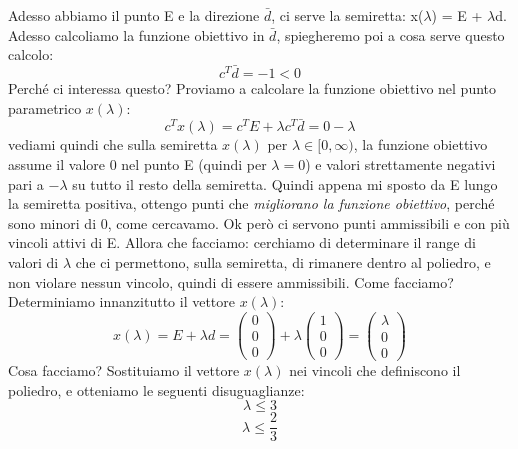 Adesso abbiamo il punto E e la direzione $\bar{d}$, ci serve la semiretta: x($\lambda$) = E + $\lambda$d. Adesso calcoliamo la funzione obiettivo in $\bar{d}$, spiegheremo poi a cosa serve questo calcolo:
\begin{equation*}
    c^T\bar{d} = -1 < 0
\end{equation*}
Perché ci interessa questo? Proviamo a calcolare la funzione obiettivo nel punto parametrico $x(\lambda)$:
\begin{equation*}
    c^Tx(\lambda) = c^TE + \lambda c^T\bar{d} = 0 - \lambda
\end{equation*}
vediami quindi che sulla semiretta $x(\lambda)$ per $\lambda \in [0, \infty)$, la funzione obiettivo assume il valore 0 nel punto E (quindi per $\lambda = 0$) e valori strettamente negativi pari a $-\lambda$ su tutto il resto della semiretta. Quindi appena mi sposto da E lungo la semiretta positiva, ottengo punti che \textit{migliorano la funzione obiettivo}, perché sono minori di 0, come cercavamo. Ok però ci servono punti ammissibili e con più vincoli attivi di E. Allora che facciamo: cerchiamo di determinare il range di valori di $\lambda$ che ci permettono, sulla semiretta, di rimanere dentro al poliedro, e non violare nessun vincolo, quindi di essere ammissibili. Come facciamo? Determiniamo innanzitutto il vettore $x(\lambda)$:
\begin{equation*}
    x(\lambda) = E + \lambda d = \begin{pmatrix}
        0\\
        0\\
        0
    \end{pmatrix} + \lambda \begin{pmatrix}
        1\\
        0\\
        0
    \end{pmatrix} = \begin{pmatrix}
        \lambda\\
        0\\
        0
    \end{pmatrix}
\end{equation*}
Cosa facciamo? Sostituiamo il vettore $x(\lambda)$ nei vincoli che definiscono il poliedro, e otteniamo le seguenti disuguaglianze:
\begin{equation*}
    \lambda \leq 3
\end{equation*}
\begin{equation*}
    \lambda \leq \frac{2}{3}
\end{equation*}
